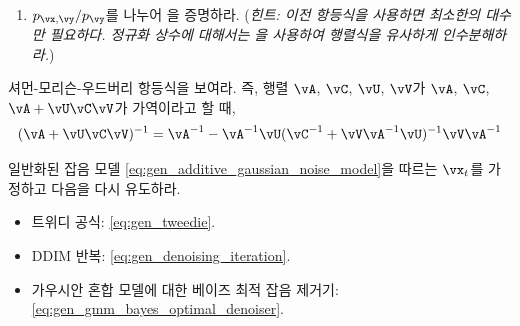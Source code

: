 \documentclass[../../book-main_ko.tex]{subfiles}
\begin{document}
\begin{exercise}
\begin{enumerate}
\begin{align}
        \begin{bmatrix}
          \vx - \left(\vmu_{\vx} + \vSigma_{\vx\vy}\vSigma_{\vy}^{-1}(\vy
          - \vmu_{\vy})\right) \\
          \vy - \vmu_{\vy}
        \end{bmatrix}.
      \end{align}
      (\textit{힌트: 대수적 조작을 절약하기 위해,
      의 RHS에 있는 첫 번째
      행렬과 마지막 행렬은 서로의 전치 행렬임에 유의하라.})
    \item $p_{\vx, \vy} / p_{\vy}$를 나누어
      을 증명하라. (\textit{힌트: 이전
      항등식을 사용하면 최소한의 대수만 필요하다. 정규화
      상수에 대해서는 을 사용하여
      행렬식을 유사하게 인수분해하라.})

  \end{enumerate}


\end{exercise}

\begin{exercise}\label{exercise:sherman_morrison_woodbury_identity}
    셔먼-모리슨-우드버리 항등식을 보여라. 즉, 행렬 \(\vA\), \(\vC\), \(\vU\), \(\vV\)가 \(\vA\), \(\vC\), \(\vA + \vU\vC\vV\)가 가역이라고 할 때,
    \begin{equation}
        (\vA + \vU\vC\vV)^{-1} = \vA^{-1} - \vA^{-1}\vU(\vC^{-1} + \vV\vA^{-1}\vU)^{-1}\vV\vA^{-1}
    \end{equation}
\end{exercise}

\begin{exercise}\label{exercise:generalizing_results_to_different_noise_models}
    일반화된 잡음 모델 \eqref{eq:gen_additive_gaussian_noise_model}을 따르는 \(\vx_{t}\)를 가정하고 다음을 다시 유도하라.
    \begin{itemize}
        \item 트위디 공식: \eqref{eq:gen_tweedie}.
        \item DDIM 반복: \eqref{eq:gen_denoising_iteration}.
        \item 가우시안 혼합 모델에 대한 베이즈 최적 잡음 제거기: \eqref{eq:gen_gmm_bayes_optimal_denoiser}.
    \end{itemize}
\end{exercise}
\end{document}
